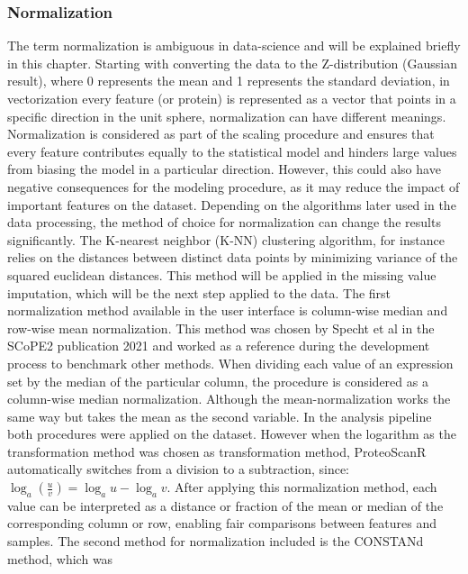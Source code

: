 \documentclass[
  11pt,
]{article}
\begin{document}
\hypertarget{normalization}{%
\subsubsection{Normalization}\label{normalization}}

The term normalization is ambiguous in data-science and will be
explained briefly in this chapter. Starting with converting the data to
the Z-distribution (Gaussian result), where 0 represents the mean and 1
represents the standard deviation, in vectorization every feature (or
protein) is represented as a vector that points in a specific direction
in the unit sphere, normalization can have different meanings.
Normalization is considered as part of the scaling procedure and ensures
that every feature contributes equally to the statistical model and
hinders large values from biasing the model in a particular direction.
However, this could also have negative consequences for the modeling
procedure, as it may reduce the impact of important features on the
dataset. Depending on the algorithms later used in the data processing,
the method of choice for normalization can change the results
significantly. The K-nearest neighbor (K-NN) clustering algorithm, for
instance relies on the distances between distinct data points by
minimizing variance of the squared euclidean distances. This method will
be applied in the missing value imputation, which will be the next step
applied to the data. The first normalization method available in the
user interface is column-wise median and row-wise mean normalization.
This method was chosen by Specht et al in the SCoPE2 publication 2021
\citep{Specht2021} and worked as a reference during the development
process to benchmark other methods. When dividing each value of an
expression set by the median of the particular column, the procedure is
considered as a column-wise median normalization. Although the
mean-normalization works the same way but takes the mean as the second
variable. In the analysis pipeline both procedures were applied on the
dataset. However when the logarithm as the transformation method was
chosen as transformation method, ProteoScanR automatically switches from
a division to a subtraction, since:
\(\log_a \left(\frac{u}{v}\right)=\log_a u-\log_a v\). After applying
this normalization method, each value can be interpreted as a distance
or fraction of the mean or median of the corresponding column or row,
enabling fair comparisons between features and samples. The second
method for normalization included is the CONSTANd method, which was
\end{document}
